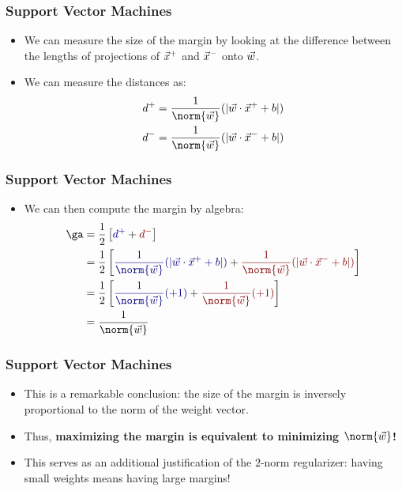 \documentclass[trans,aspectratio=169]{beamer}
\begin{document}
\begin{frame}
  \frametitle{Support Vector Machines}
\begin{itemize}
\item We can measure the size of the margin by
looking at the difference between the lengths of projections of
${\vec x}^+$ and ${\vec x}^-$ onto ${\vec w}$.  
\item 
We can measure the distances as:
%
\begin{align}
d^+ &= \frac 1 {\norm{\vw}} (|\dotp{\vw}{\vx^+} + b|) \\
d^- &=  \frac 1 {\norm{\vw}}(|\dotp{\vw}{\vx^-} + b|) 
\end{align}
%
\end{itemize}
\end{frame}
\begin{frame}
  \frametitle{Support Vector Machines}
\begin{itemize}
\item We can then compute the margin by algebra:
%
\begin{align}
\ga
&= \frac 1 2 \left[ \textcolor{darkblue}{d^+} 
                  +\textcolor{darkred}{d^-} \right] \\
&= \frac 1 2
   \left[
   \textcolor{darkblue}{\frac 1 {\norm{\vw}} (|\dotp{\vw}{\vx^+} + b|) }
 + \textcolor{darkred}{\frac 1 {\norm{\vw}} (|\dotp{\vw}{\vx^-} +b|) }
   \right]
\\
&= \frac 1 2 \left[
   \textcolor{darkblue}{\frac 1 {\norm{\vw}} (+1) }
 +\textcolor{darkred}{\frac 1 {\norm{\vw}} (+1) }
 \right]
\\
&= \frac 1 {\norm{\vw}}
\end{align}
%
\end{itemize}
\end{frame}
\begin{frame}
  \frametitle{Support Vector Machines}
\begin{itemize}
\item 
This is a remarkable conclusion: the size of the margin is inversely
proportional to the norm of the weight vector.
\item   Thus, {\bf maximizing
  the margin is equivalent to minimizing $\norm{\vw}$!}  
  \item This serves
as an additional justification of the $2$-norm regularizer: having
small weights means having large margins!
\end{itemize}
\end{frame}
\end{document}
